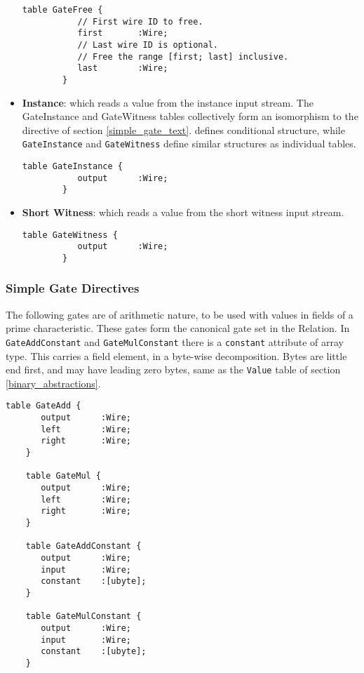\begin{itemize}[label={}]
    \begin{lstlisting}[style=fbslisting]
        table GateFree {
           // First wire ID to free.
           first       :Wire;
           // Last wire ID is optional. 
           // Free the range [first; last] inclusive.
           last        :Wire;
        }
    \end{lstlisting}

  \item \textbf{Instance}: which reads a value from the instance input stream. The \textsf{GateInstance} and \textsf{GateWitness} tables collectively form an isomorphism to the  directive of section \ref{simple_gate_text}.  defines conditional structure, while \texttt{GateInstance} and \texttt{GateWitness} define similar structures as individual tables.

    \begin{lstlisting}[style=fbslisting]
        table GateInstance {
           output      :Wire;
        }
    \end{lstlisting}

  \item \textbf{Short Witness}: which reads a value from the short witness input stream.

    \begin{lstlisting}[style=fbslisting]
        table GateWitness {
           output      :Wire;
        }
    \end{lstlisting}
\end{itemize}

\subsubsection{Simple Gate Directives}\label{sec:simple-gates}

The following gates are of arithmetic nature, to be used with values in fields of a prime characteristic. These gates form the canonical  gate set in the \textsf{Relation}.
In \texttt{GateAddConstant} and \texttt{GateMulConstant} there is a \texttt{constant} attribute of array type.
This carries a field element, in a byte-wise decomposition. Bytes are little end first, and may have leading zero bytes, same as the \texttt{Value} table of section \ref{binary_abstractions}.

\begin{lstlisting}[style=fbslisting]
    table GateAdd {
       output      :Wire;
       left        :Wire;
       right       :Wire;
    }
    
    table GateMul {
       output      :Wire;
       left        :Wire;
       right       :Wire;
    }
    
    table GateAddConstant {
       output      :Wire;
       input       :Wire;
       constant    :[ubyte];
    }
    
    table GateMulConstant {
       output      :Wire;
       input       :Wire;
       constant    :[ubyte];
    }
\end{lstlisting}

